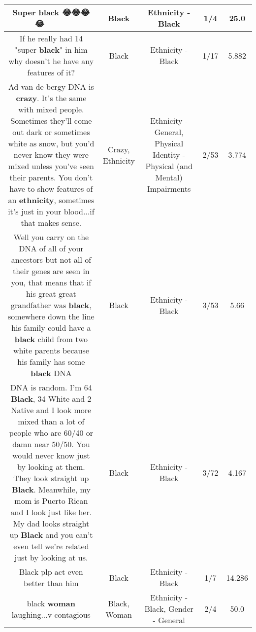 \documentclass[11pt]{article}
\newlength\mylength
\begin{document}
\begin{center}
\begin{longtable}{|C{.65\mylength}|C{.30\mylength}|C{.12\mylength}|C{.12\mylength}|C{.12\mylength}|}
  \small Super \textbf{black} 😂😂😂😂 🤣😂🤣😂🤣😂🤣😂🤣\normalsize   & Black & Ethnicity - Black & 1/4 & 25.0 \\  \hline
  \small If he really had 14 "super \textbf{black}" in him why doesn't he have any features of it?\normalsize   & Black & Ethnicity - Black & 1/17 & 5.882 \\  \hline
  \small Ad van de bergy DNA is \textbf{crazy}. It's the same with mixed people. Sometimes they'll come out dark or sometimes white as snow, but you'd never know they were mixed unless you've seen their parents. You don't have to show features of an \textbf{ethnicity}, sometimes it's just in your blood...if that makes sense.\normalsize   & Crazy, Ethnicity & Ethnicity - General, Physical Identity - Physical (and Mental) Impairments & 2/53 & 3.774 \\  \hline
  \small Well you carry on the DNA of all of your ancestors but not all of their genes are seen in you, that means that if his great great grandfather was \textbf{black}, somewhere down the line his family could have a \textbf{black} child from two white parents because his family has some \textbf{black} DNA\normalsize   & Black & Ethnicity - Black & 3/53 & 5.66 \\  \hline
  \small DNA is random. I'm 64 \textbf{Black}, 34 White and 2 Native and I look more mixed than a lot of people who are 60/40 or damn near 50/50. You would never know just by looking at them. They look straight up \textbf{Black}. Meanwhile, my mom is Puerto Rican and I look just like her. My dad looks straight up \textbf{Black} and you can't even tell we're related just by looking at us.\normalsize   & Black & Ethnicity - Black & 3/72 & 4.167 \\  \hline
  \small Black plp act even better than him\normalsize   & Black & Ethnicity - Black & 1/7 & 14.286 \\  \hline
  \small black \textbf{woman} laughing...v contagious\normalsize   & Black, Woman & Ethnicity - Black, Gender - General & 2/4 & 50.0 \\  \hline

\end{longtable}
\end{center}
\end{document}
